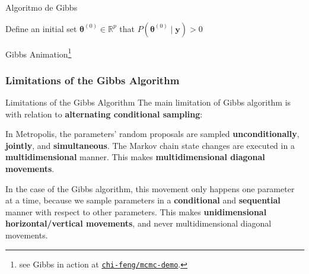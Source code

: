 \begin{frame}[fragile]{Algoritmo de Gibbs}
	\SetAlCapFnt{\normalsize}
	\SetAlCapNameFnt{\normalsize}
	\begin{algorithm}[H]
		\DontPrintSemicolon
		\SetAlgoNoEnd
		\SetAlgoLined
		Define an initial set $\boldsymbol{\theta}^{(0)} \in \mathbb{R}^p$ that $P\left(\boldsymbol{\theta}^{(0)} \mid \mathbf{y} \right) > 0$\;
		\caption{Gibbs}
	\end{algorithm}
\end{frame}

\begin{frame}{Gibbs Animation\footnote{see Gibbs in action at \href{https://chi-feng.github.io/mcmc-demo/app.html?algorithm=GibbsSampling&target=banana}{\texttt{chi-feng/mcmc-demo}}.}}
	\centering
\end{frame}

\subsubsection{Limitations of the Gibbs Algorithm}
\begin{frame}{Limitations of the Gibbs Algorithm}
	The main limitation of Gibbs algorithm is with relation to
	\textbf{alternating conditional sampling}:
	\begin{vfilleditems}
		\item In Metropolis, the parameters' random proposals are sampled
		\textbf{unconditionally}, \textbf{jointly}, and \textbf{simultaneous}.
		The Markov chain state changes are executed in a
		\textbf{multidimensional} manner.
		This makes \textbf{multidimensional diagonal movements}.
		\item In the case of the Gibbs algorithm,
		this movement only happens one parameter at a time,
		because we sample parameters in a
		\textbf{conditional} and \textbf{sequential} manner with respect
		to other parameters.
		This makes \textbf{unidimensional horizontal/vertical movements},
		and never multidimensional diagonal movements.
	\end{vfilleditems}
\end{frame}

